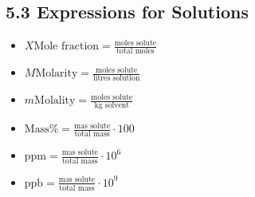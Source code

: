 \subsection{5.3 Expressions for Solutions}
\begin{itemize}
    \item $X \textrm{Mole fraction} = \frac{\textrm{moles solute}}{\textrm{total moles}}$
    \item $M \textrm{Molarity} = \frac{\textrm{moles solute}}{\textrm{litres solution}}$
    \item $m \textrm{Molality} = \frac{\textrm{moles solute}}{\textrm{kg solvent}}$
    \item $\textrm{Mass} \% = \frac{\textrm{mas solute}}{\textrm{total mass}} \cdot 100$
    \item $\textrm{ppm} = \frac{\textrm{mas solute}}{\textrm{total mass}} \cdot 10^6$
    \item $\textrm{ppb} = \frac{\textrm{mas solute}}{\textrm{total mass}} \cdot 10^9$
\end{itemize}
